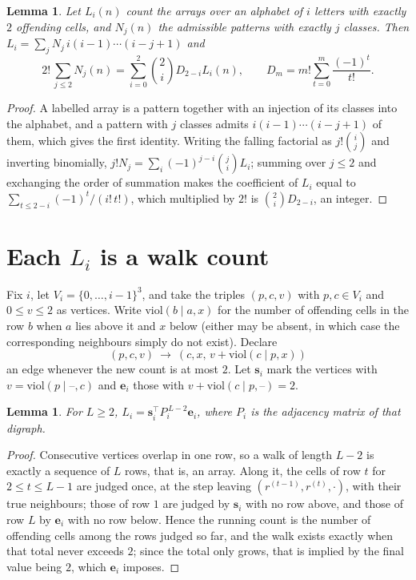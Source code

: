 \documentclass[11pt,a4paper]{article}
\theoremstyle{plain}
\newtheorem{lemma}[theorem]{Lemma}
\theoremstyle{definition}
\begin{document}
\begin{lemma}\label{lem:inv}
Let $L_i(n)$ count the arrays over an alphabet of $i$ letters with exactly $2$ offending
cells, and $N_j(n)$ the admissible patterns with exactly $j$ classes. Then
$L_i=\sum_j N_j\,i(i-1)\cdots(i-j+1)$ and
\[
2!\,\sum_{j\le2}N_j(n)=\sum_{i=0}^{2}\binom{2}{i}D_{2-i}L_i(n),
\qquad D_m=m!\sum_{t=0}^{m}\frac{(-1)^t}{t!} .
\]
\end{lemma}

\begin{proof}
A labelled array is a pattern together with an injection of its classes into the alphabet,
and a pattern with $j$ classes admits $i(i-1)\cdots(i-j+1)$ of them, which gives the first
identity. Writing the falling factorial as $j!\binom{i}{j}$ and inverting binomially,
$j!N_j=\sum_i(-1)^{j-i}\binom{j}{i}L_i$; summing over $j\le2$ and exchanging the
order of summation makes the coefficient of $L_i$ equal to
$\sum_{t\le2-i}(-1)^t/(i!\,t!)$, which multiplied by $2!$ is
$\binom{2}{i}D_{2-i}$, an integer.
\end{proof}

\section{Each $L_i$ is a walk count}

Fix $i$, let $V_i=\{0,\dots,i-1\}^{3}$, and take the triples $(p,c,v)$ with
$p,c\in V_i$ and $0\le v\le2$ as vertices. Write $\mathrm{viol}(b\mid a,x)$ for the number
of offending cells in the row $b$ when $a$ lies above it and $x$ below (either may be
absent, in which case the corresponding neighbours simply do not exist). Declare
\[
(p,c,v)\ \longrightarrow\ (c,x,\,v+\mathrm{viol}(c\mid p,x))
\]
an edge whenever the new count is at most $2$. Let $\mathbf{s}_i$ mark the vertices with
$v=\mathrm{viol}(p\mid\text{--},c)$ and $\mathbf{e}_i$ those with
$v+\mathrm{viol}(c\mid p,\text{--})=2$.

\begin{lemma}\label{lem:walk}
For $L\ge2$, $L_i=\mathbf{s}_i^{\!\top}P_i^{\,L-2}\mathbf{e}_i$, where $P_i$ is the
adjacency matrix of that digraph.
\end{lemma}

\begin{proof}
Consecutive vertices overlap in one row, so a walk of length $L-2$ is exactly a sequence
of $L$ rows, that is, an array. Along it, the cells of row $t$ for $2\le t\le L-1$ are
judged once, at the step leaving $(r^{(t-1)},r^{(t)},\cdot)$, with their true neighbours;
those of row $1$ are judged by $\mathbf{s}_i$ with no row above, and those of row
$L$ by $\mathbf{e}_i$ with no row below. Hence the running count is the number of
offending cells among the rows judged so far, and the walk exists exactly when that total
never exceeds $2$; since the total only grows, that is implied by the final value being
$2$, which $\mathbf{e}_i$ imposes.
\end{proof}
\end{document}
